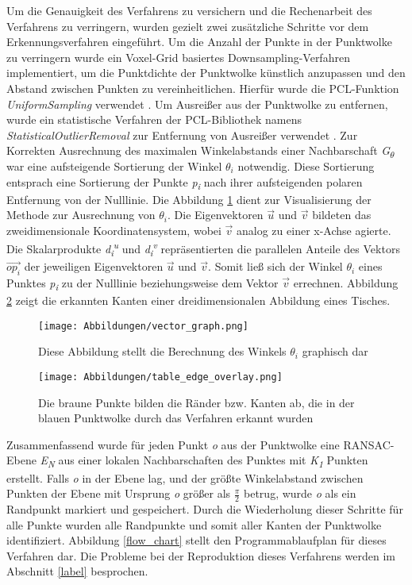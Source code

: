Um die Genauigkeit des Verfahrens zu versichern und die Rechenarbeit des Verfahrens zu verringern, wurden gezielt zwei zusätzliche Schritte vor dem Erkennungsverfahren eingeführt. Um die Anzahl der Punkte in der Punktwolke zu verringern wurde ein Voxel-Grid basiertes Downsampling-Verfahren implementiert, um die Punktdichte der Punktwolke künstlich anzupassen und den Abstand zwischen Punkten zu vereinheitlichen. Hierfür wurde die PCL-Funktion \textit{UniformSampling} verwendet \autocite{noauthor_point_2023}. Um Ausreißer aus der Punktwolke zu entfernen, wurde ein statistische Verfahren der PCL-Bibliothek namens \textit{StatisticalOutlierRemoval} zur Entfernung von Ausreißer verwendet \autocite{rusu_towards_2008}. Zur Korrekten Ausrechnung des maximalen Winkelabstands einer Nachbarschaft \textit{G\textsubscript{$\theta$}} war eine aufsteigende Sortierung der Winkel \textit{$\theta_i$} notwendig. Diese Sortierung entsprach eine Sortierung der Punkte \textit{p\textsubscript{i}} nach ihrer aufsteigenden polaren Entfernung von der Nulllinie. Die Abbildung \ref{vector_graph} dient zur Visualisierung der Methode zur Ausrechnung von $\theta_i$. Die Eigenvektoren $\vec{u}$ und $\vec{v}$ bildeten das zweidimensionale Koordinatensystem, wobei $\vec{v}$ analog zu einer x-Achse agierte. Die Skalarprodukte \textit{d\textsubscript{i}\textsuperscript{u}} und \textit{d\textsubscript{i}\textsuperscript{v}} repräsentierten die parallelen Anteile des Vektors $\vec{{op}_i}$ der jeweiligen Eigenvektoren $\vec{u}$ und $\vec{v}$. Somit ließ sich der Winkel $\theta_i$ eines Punktes \textit{p\textsubscript{i}} zu der Nulllinie beziehungsweise dem Vektor $\vec{v}$ errechnen. Abbildung \ref{edge_points_table} zeigt die erkannten Kanten einer dreidimensionalen Abbildung eines Tisches.

\begin{figure}[t]
	\texttt{[image: Abbildungen/vector\_graph.png]}
	\centering
	\caption{Diese Abbildung stellt die Berechnung des Winkels $\theta_i$ graphisch dar}
	\label{vector_graph}
\end{figure}

\begin{figure}[h]
	\texttt{[image: Abbildungen/table\_edge\_overlay.png]}
	\centering
	\caption{Die braune Punkte bilden die Ränder bzw. Kanten ab, die in der blauen Punktwolke durch das Verfahren erkannt wurden}
	\label{edge_points_table}
\end{figure}

Zusammenfassend wurde für jeden Punkt \textit{o} aus der Punktwolke eine RANSAC-Ebene \textit{E\textsubscript{N}} aus einer lokalen Nachbarschaften des Punktes mit \textit{K\textsubscript{1}} Punkten erstellt. Falls \textit{o} in der Ebene lag, und der größte Winkelabstand zwischen Punkten der Ebene mit Ursprung \textit{o} größer als $\frac{\pi}{2}$ betrug, wurde \textit{o} als ein Randpunkt markiert und gespeichert. Durch die Wiederholung dieser Schritte für alle Punkte wurden alle Randpunkte und somit aller Kanten der Punktwolke identifiziert. Abbildung \ref{flow_chart} stellt den Programmablaufplan für dieses Verfahren dar. Die Probleme bei der Reproduktion dieses Verfahrens werden im Abschnitt \ref{label} besprochen.

